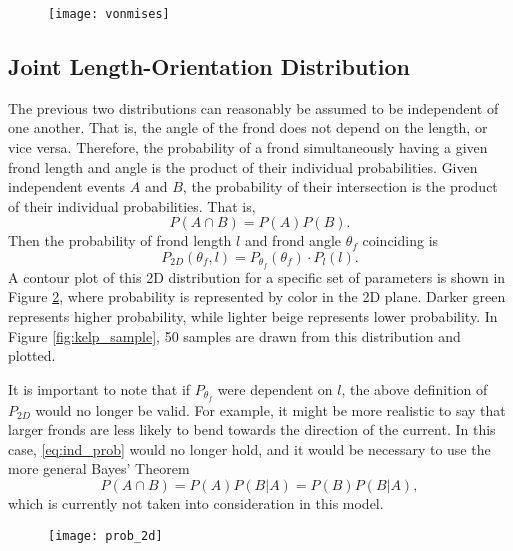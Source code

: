 \begin{figure}[h]
	\centering
	\texttt{[image: vonmises]}
	\label{fig:vonmises}
\end{figure}

\subsection{Joint Length-Orientation Distribution}
\label{sec:dist_2d}
The previous two distributions can reasonably be assumed to be independent of one another. That is, the angle of the frond does not depend on the length, or vice versa.
Therefore, the probability of a frond simultaneously having a given frond length and angle is the product of their individual probabilities.
Given independent events $A$ and $B$, the probability of their intersection is the product of their individual probabilities.
That is,
\begin{equation*}
	\label{eq:ind_prob}
	P(A \cap B) = P(A)P(B).
\end{equation*}
Then the probability of frond length $l$ and frond angle $\theta_f$ coinciding is
\begin{equation}
  \label{eq:p2d}
	P_{2D}(\theta_f,l) = P_{\theta_f}(\theta_f) \cdot P_l(l).
\end{equation}
A contour plot of this 2D distribution for a specific set of parameters is shown in Figure \ref{fig:dist_2d}, where probability is represented by color in the 2D plane.
Darker green represents higher probability, while lighter beige represents lower probability.
In Figure \ref{fig:kelp_sample}, 50 samples are drawn from this distribution and plotted.

It is important to note that if $P_{\theta_f}$ were dependent on $l$, the above definition of $P_{2D}$ would no longer be valid.
For example, it might be more realistic to say that larger fronds are less likely to bend towards the direction of the current.
In this case, \eqref{eq:ind_prob} would no longer hold, and it would be necessary to use the more general Bayes' Theorem
\begin{equation*}
	P(A \cap B) = P(A)P(B|A) = P(B)P(B|A),
\end{equation*}
which is currently not taken into consideration in this model.

\begin{figure}[h]
	\centering
	\texttt{[image: prob\_2d]}
	\label{fig:dist_2d}
\end{figure}

